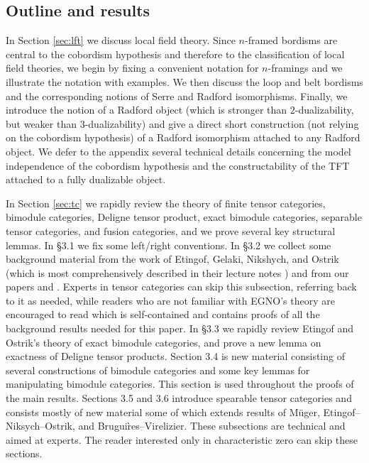 \documentclass{amsart}
\begin{document}
\subsection*{Outline and results}

In Section \ref{sec:lft} we discuss local field theory.  Since $n$-framed bordisms are central to the cobordism hypothesis and therefore to the classification of local field theories, we begin by fixing a convenient notation for $n$-framings and we illustrate the notation with examples.  We then discuss the loop and belt bordisms and the corresponding notions of Serre and Radford isomorphisms.  Finally, we introduce the notion of a Radford object (which is stronger than $2$-dualizability, but weaker than $3$-dualizability) and give a direct short construction (not relying on the cobordism hypothesis) of a Radford isomorphism attached to any Radford object.  We defer to the appendix several technical details concerning the model independence of the cobordism hypothesis and the constructability of the TFT attached to a fully dualizable object.

In Section \ref{sec:tc} we rapidly review the theory of finite tensor categories, bimodule categories, Deligne tensor product, exact bimodule categories, separable tensor categories, and fusion categories, and we prove several key structural lemmas.   In \S 3.1 we fix some left/right conventions.  In \S 3.2 we collect some background material from the work of Etingof, Gelaki, Nikshych, and Ostrik (which is most comprehensively described in their lecture notes \cite{EGNO}) and from our papers \cite{BTP} and \cite{3TC}.  Experts in tensor categories can skip this subsection, referring back to it as needed, while readers who are not familiar with EGNO's theory are encouraged to read \cite{BTP} which is self-contained and contains proofs of all the background results needed for this paper.  In \S 3.3 we rapidly review Etingof and Ostrik's theory of exact bimodule categories, and prove a new lemma on exactness of Deligne tensor products.  Section 3.4 is new material consisting of several constructions of bimodule categories and some key lemmas for manipulating bimodule categories.  This section is used throughout the proofs of the main results.  Sections 3.5 and 3.6 introduce spearable tensor categories and consists mostly of new material some of which extends results of M\"uger, Etingof--Niksych--Ostrik, and Brugui\`res--Virelizier.  These subsections are technical and aimed at experts.  The reader interested only in characteristic zero can skip these sections.
\end{document}
